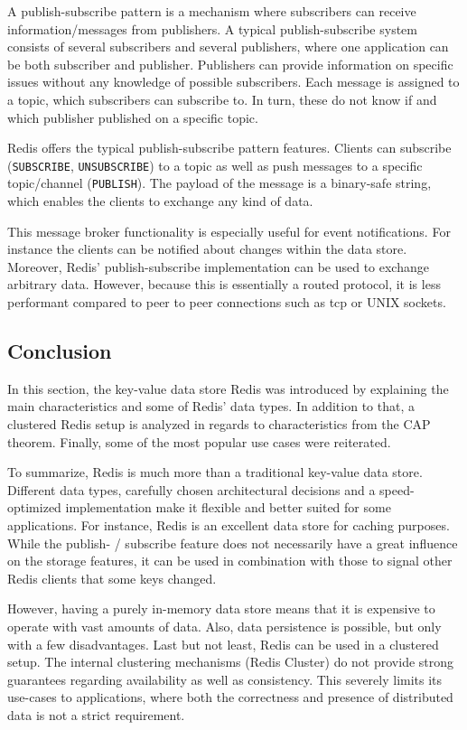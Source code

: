 A publish-subscribe pattern is a mechanism where subscribers can receive
information/messages from publishers. A typical publish-subscribe system
consists of several subscribers and several publishers, where one application can
be both subscriber and publisher. Publishers can provide information on specific
issues without any knowledge of possible subscribers. Each message is assigned
to a topic, which subscribers can subscribe to. In turn, these do not know if and
which publisher published on a specific topic. \parencite{redis:ibmPubSub}

Redis offers the typical publish-subscribe pattern features. Clients can
subscribe (\texttt{SUBSCRIBE}, \texttt{UNSUBSCRIBE}) to a topic as well as push
messages to a specific topic/channel (\texttt{PUBLISH}). The payload of the
message is a binary-safe string, which enables the clients to exchange any kind
of data.

This message broker functionality is especially useful for event notifications.
For instance the clients can be notified about changes within the data store.
Moreover, Redis' publish-subscribe implementation can be used to exchange
arbitrary data. However, because this is essentially a routed protocol, it is
less performant compared to peer to peer connections such as \gls{tcp} or UNIX
sockets. \parencite{redis:PubSub}

\subsection{Conclusion}
In this section, the key-value data store Redis was introduced by explaining the
main characteristics and some of Redis' data types. In addition to that, a
clustered Redis setup is analyzed in regards to characteristics from the CAP
theorem.  Finally, some of the most popular use cases were reiterated.

To summarize, Redis is much more than a traditional key-value data store.
Different data types, carefully chosen architectural decisions and a
speed-optimized implementation make it flexible and better suited for some
applications. For instance, Redis is an excellent data store for caching
purposes. While the publish- / subscribe feature does not necessarily have a
great influence on the storage features, it can be used in combination with
those to signal other Redis clients that some keys changed.

However, having a purely in-memory data store means that it is expensive to
operate with vast amounts of data. Also, data persistence is possible, but only
with a few disadvantages. Last but not least, Redis can be used in a clustered
setup. The internal clustering mechanisms (Redis Cluster) do not provide strong
guarantees regarding availability as well as consistency. This severely limits
its use-cases to applications, where both the correctness and presence of
distributed data is not a strict requirement.
